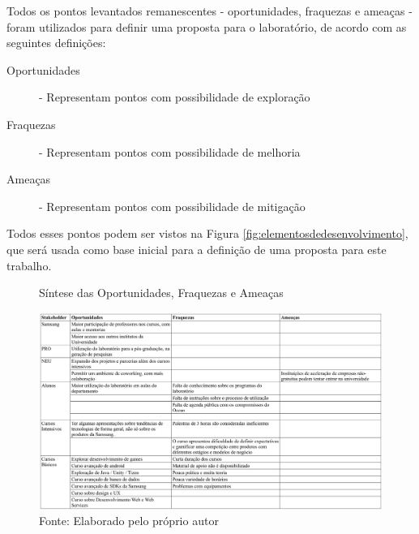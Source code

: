Todos os pontos levantados remanescentes - oportunidades, fraquezas e ameaças - foram utilizados para definir uma proposta para o laboratório, de acordo com as seguintes definições:

\begin{description}
\item[Oportunidades] - Representam pontos com possibilidade de exploração
\item[Fraquezas] - Representam pontos com possibilidade de melhoria
\item[Ameaças] - Representam pontos com possibilidade de mitigação
\end{description}

Todos esses pontos podem ser vistos na Figura  \ref{fig:elementosdedesenvolvimento}, que será usada como base inicial para a definição de uma proposta para este trabalho. 

\begin{landscape}

\begin{figure}
\caption{Síntese das Oportunidades, Fraquezas e Ameaças}
\centerline{\includegraphics[scale=0.6]{img/oportunidadesfraquezasameacas}}
\label{fig:oportunidadesfraquezasameacas}
\caption* {Fonte: Elaborado pelo próprio autor}
\end{figure}

\end{landscape}
